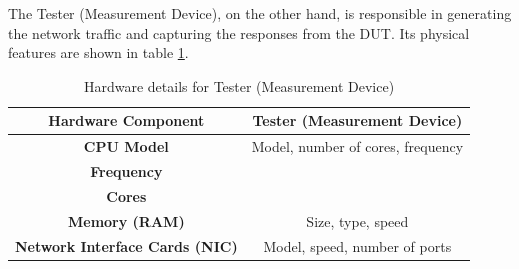 The Tester (Measurement Device), on the other hand, is responsible in generating the network traffic and capturing the responses from the DUT.
Its physical features are shown in table \ref{tab:hardware_tester}. 

\begin{table}[h!]
\centering
\begin{tabular}{|c|c|}
\hline
\textbf{Hardware Component} & \textbf{Tester (Measurement Device)} \\
\hline
\textbf{CPU Model} & Model, number of cores, frequency \\
\hline
\textbf{Frequency} & \\
\hline
\textbf{Cores} & \\
\hline
\textbf{Memory (RAM)} & Size, type, speed \\
\hline
\textbf{Network Interface Cards (NIC)} & Model, speed, number of ports \\
\hline
\end{tabular}
\caption{Hardware details for Tester (Measurement Device)}
\label{tab:hardware_tester}
\end{table}
